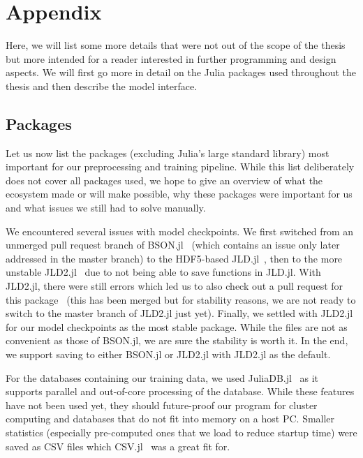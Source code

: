 \section{Appendix}

Here, we will list some more details that were not out of the scope of
the thesis but more intended for a reader interested in further
programming and design aspects. We will first go more in detail on the
Julia packages used throughout the thesis and then describe the model
interface.

\subsection{Packages}
\label{sec:packages}

Let us now list the packages (excluding Julia's large standard
library) most important for our preprocessing and training pipeline.
While this list deliberately does not cover all packages used, we hope
to give an overview of what the ecosystem made or will make possible,
why these packages were important for us and what issues we still had
to solve manually.

We encountered several issues with model checkpoints. We first
switched from an unmerged pull request branch of
\mbox{BSON.jl}~\cite{JuliaIOBSONJl2019,keslerSavingArrayLength} (which
contains an issue only later addressed in the master branch) to the
HDF5-based \mbox{JLD.jl}~\cite{JuliaIOJLDJl2019}, then to the more
unstable \mbox{JLD2.jl}~\cite{JuliaIOJLD2Jl2019} due to not being able
to save functions in \mbox{JLD.jl}. With \mbox{JLD2.jl}, there were
still errors which led us to also check out a pull request for this
package~\cite{palethorpeMaybeFixTypename} (this has been merged but
for stability reasons, we are not ready to switch to the master branch
of \mbox{JLD2.jl} just yet). Finally, we settled with \mbox{JLD2.jl}
for our model checkpoints as the most stable package. While the files
are not as convenient as those of \mbox{BSON.jl}, we are sure the
stability is worth it. In the end, we support saving to either
\mbox{BSON.jl} or \mbox{JLD2.jl} with \mbox{JLD2.jl} as the default.

For the databases containing our training data, we used
\mbox{JuliaDB.jl}~\cite{JuliaComputingJuliaDBJl2019} as it supports
parallel and out-of-core processing of the database. While these
features have not been used yet, they should future-proof our program
for cluster computing and databases that do not fit into memory on a
host PC. Smaller statistics (especially pre-computed ones that we load
to reduce startup time) were saved as CSV files which
\mbox{CSV.jl}~\cite{JuliaDataCSVJl2019} was a great fit for.

